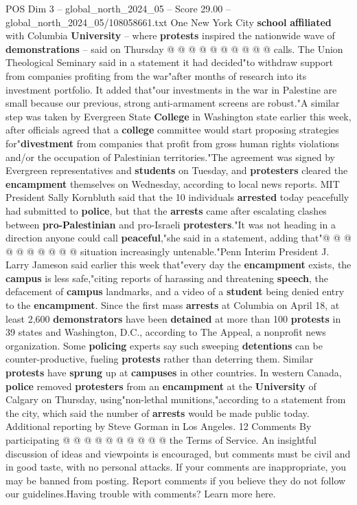 \begin{textsample}{POS Dim 3 – global\_north\_2024\_05 – Score 29.00 – global\_north\_2024\_05/108058661.txt}
One New York City \textbf{school} \textbf{affiliated} with Columbia \textbf{University} -- where \textbf{protests} inspired the nationwide wave of \textbf{demonstrations} -- said on Thursday @ @ @ @ @ @ @ @ @ @ calls.
The Union Theological Seminary said in a statement it had decided"to withdraw support from companies profiting from the war"after months of research into its investment portfolio.
It added that"our investments in the war in Palestine are small because our previous, strong anti-armament screens are robust."A similar step was taken by Evergreen State \textbf{College} in Washington state earlier this week, after officials agreed that a \textbf{college} committee would start proposing strategies for"\textbf{divestment} from companies that profit from gross human rights violations and/or the occupation of Palestinian territories."The agreement was signed by Evergreen representatives and \textbf{students} on Tuesday, and \textbf{protesters} cleared the \textbf{encampment} themselves on Wednesday, according to local news reports.
MIT President Sally Kornbluth said that the 10 individuals \textbf{arrested} today peacefully had submitted to \textbf{police}, but that the \textbf{arrests} came after escalating clashes between \textbf{pro-Palestinian} and pro-Israeli \textbf{protesters}."It was not heading in a direction anyone could call \textbf{peaceful},"she said in a statement, adding that"@ @ @ @ @ @ @ @ @ @ situation increasingly untenable."Penn Interim President J.
Larry Jameson said earlier this week that"every day the \textbf{encampment} exists, the \textbf{campus} is less safe,"citing reports of harassing and threatening \textbf{speech}, the defacement of \textbf{campus} landmarks, and a video of a \textbf{student} being denied entry to the \textbf{encampment}.
Since the first mass \textbf{arrests} at Columbia on April 18, at least 2,600 \textbf{demonstrators} have been \textbf{detained} at more than 100 \textbf{protests} in 39 states and Washington, D.C., according to The Appeal, a nonprofit news organization.
Some \textbf{policing} experts say such sweeping \textbf{detentions} can be counter-productive, fueling \textbf{protests} rather than deterring them.
Similar \textbf{protests} have \textbf{sprung} up at \textbf{campuses} in other countries.
In western Canada, \textbf{police} removed \textbf{protesters} from an \textbf{encampment} at the \textbf{University} of Calgary on Thursday, using"non-lethal munitions,"according to a statement from the city, which said the number of \textbf{arrests} would be made public today.
Additional reporting by Steve Gorman in Los Angeles. 12 Comments By participating @ @ @ @ @ @ @ @ @ @ the Terms of Service.
An insightful discussion of ideas and viewpoints is encouraged, but comments must be civil and in good taste, with no personal attacks.
If your comments are inappropriate, you may be banned from posting.
Report comments if you believe they do not follow our guidelines.Having trouble with comments?
Learn more here.


\end{textsample}
